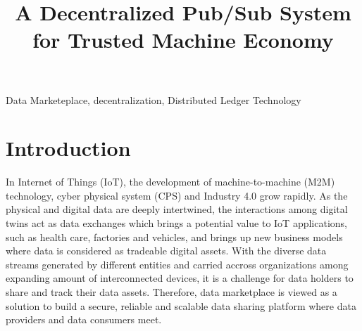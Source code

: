 \documentclass[conference]{IEEEtran}
\begin{document}
\title{A Decentralized Pub/Sub System for Trusted Machine Economy}

\author{
\and
{}
\and
{}
}

\maketitle

\begin{abstract}

\end{abstract}

\begin{IEEEkeywords}
Data Marketeplace, decentralization, Distributed Ledger Technology
\end{IEEEkeywords}

\section{Introduction}
In Internet of Things (IoT), the development of machine-to-machine (M2M) technology\cite{M2M}, cyber physical system (CPS)\cite{CPS} and Industry 4.0 grow rapidly. As the physical and digital data are deeply intertwined, the interactions among digital twins act as data exchanges\cite{digitaltwin} which brings a potential value to IoT applications, such as health care\cite{healthCare}, factories and vehicles\cite{AutonomousDriving}, and brings up new business models where data is considered as tradeable digital assets. With the diverse data streams generated by different entities and carried accross organizations among expanding amount of interconnected devices, it is a challenge for data holders to share and track their data assets. Therefore, data marketplace is viewed as a solution to build a secure, reliable and scalable data sharing platform where data providers and data consumers meet.
\end{document}
